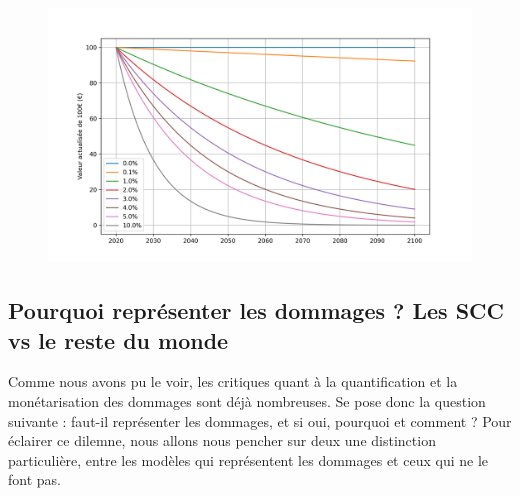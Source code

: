\begin{figure}
    \centering
    \includegraphics[width=\linewidth]{results/actualisation.png}
    \label{fig:discount-rate}
\end{figure}

\subsection{Pourquoi représenter les dommages ? Les SCC vs le reste du monde}

Comme nous avons pu le voir, les critiques quant à la quantification et la monétarisation des dommages sont déjà nombreuses. Se pose donc la question suivante : faut-il représenter les dommages, et si oui, pourquoi et comment ? Pour éclairer ce dilemne, nous allons nous pencher sur deux une distinction particulière, entre les modèles qui représentent les dommages et ceux qui ne le font pas. \\

